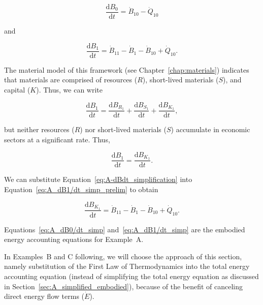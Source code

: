 \begin{equation} \label{eq:A_dB0/dt_simp}
	\frac{\mathrm{d}B_{0}}{\mathrm{d}t} 
	= \dot{B}_{10} 
	- \dot{Q}_{10}
\end{equation}

\noindent and

\begin{equation} \label{eq:A_dB1/dt_simp_prelim}
	\frac{\mathrm{d}B_{1}}{\mathrm{d}t} 
	= \dot{B}_{11}
	- \dot{B}_{1}
	- \dot{B}_{10}
	+ \dot{Q}_{10}.
\end{equation}

\noindent{}The material model of this framework (see Chapter~\ref{chap:materials})
indicates that materials are comprised of 
resources ($R$), 
short-lived materials ($S$), and
capital ($K$).
Thus, we can write 

\begin{equation}
	\frac{\mathrm{d}B_{1}}{\mathrm{d}t} 
	= \frac{\mathrm{d}B_{R_{1}}}{\mathrm{d}t} 
	+ \frac{\mathrm{d}B_{S_{1}}}{\mathrm{d}t} 
	+ \frac{\mathrm{d}B_{K_{1}}}{\mathrm{d}t},
\end{equation}

\noindent{}but neither resources ($R$) nor short-lived
materials ($S$) accumulate in economic sectors at a significant rate.
Thus, 

\begin{equation} \label{eq:A-dBdt_simplification}
	\frac{\mathrm{d}B_{1}}{\mathrm{d}t} 
	= \frac{\mathrm{d}B_{K_{1}}}{\mathrm{d}t}.
\end{equation}

\noindent{}We can substitute Equation~\ref{eq:A-dBdt_simplification}
into Equation~\ref{eq:A_dB1/dt_simp_prelim} to obtain

\begin{equation} \label{eq:A_dB1/dt_simp}
	\frac{\mathrm{d}B_{K_{1}}}{\mathrm{d}t}
	= \dot{B}_{11}
	- \dot{B}_{1}
	- \dot{B}_{10}
	+ \dot{Q}_{10}.
\end{equation}

\noindent{}Equations~\ref{eq:A_dB0/dt_simp} and~\ref{eq:A_dB1/dt_simp} are 
the embodied energy accounting equations for Example~A.

In Examples~B and C following, we will choose the approach of 
this section, namely substitution of the 
First Law of Thermodynamics
into the total energy accounting equation
(instead of simplifying the total energy equation 
as discussed in Section~\ref{sec:A_simplified_embodied}),
because of the benefit of canceling direct energy flow terms ($\dot{E}$). 


